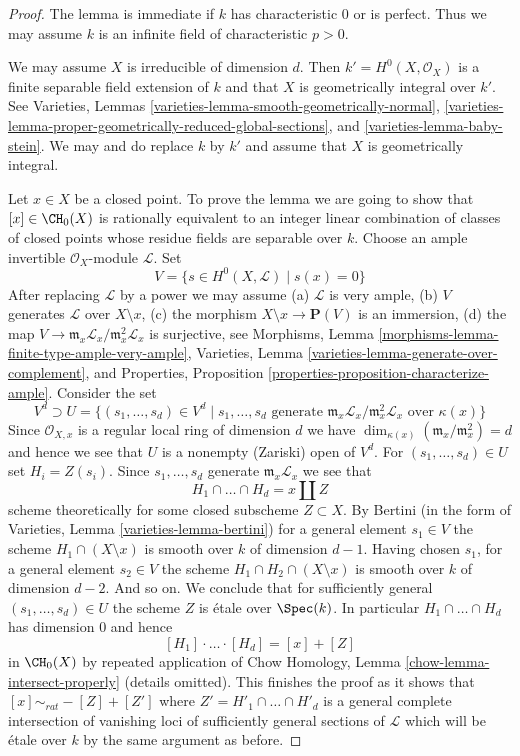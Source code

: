 \begin{proof}
The lemma is immediate if $k$ has characteristic $0$ or is perfect.
Thus we may assume $k$ is an infinite field of characteristic $p > 0$.

\medskip\noindent
We may assume $X$ is irreducible of dimension $d$.
Then $k' = H^0(X, \mathcal{O}_X)$ is a finite separable field
extension of $k$ and that $X$ is geometrically integral over $k'$.
See Varieties, Lemmas \ref{varieties-lemma-smooth-geometrically-normal},
\ref{varieties-lemma-proper-geometrically-reduced-global-sections}, and
\ref{varieties-lemma-baby-stein}. We may and do replace $k$ by $k'$
and assume that $X$ is geometrically integral.

\medskip\noindent
Let $x \in X$ be a closed point. To prove the lemma we are going to show that
$[x] \in \CH_0(X)$ is rationally equivalent to an integer linear
combination of classes of closed points whose residue fields
are separable over $k$. Choose an ample invertible
$\mathcal{O}_X$-module $\mathcal{L}$. Set
$$
V = \{s \in H^0(X, \mathcal{L}) \mid s(x) = 0 \}
$$
After replacing $\mathcal{L}$ by a power we may assume
(a) $\mathcal{L}$ is very ample, (b) $V$ generates
$\mathcal{L}$ over $X \setminus x$, (c) the morphism
$X \setminus x \to \mathbf{P}(V)$ is an immersion, (d)
the map $V \to \mathfrak m_x\mathcal{L}_x/\mathfrak m_x^2\mathcal{L}_x$
is surjective, see
Morphisms, Lemma \ref{morphisms-lemma-finite-type-ample-very-ample},
Varieties, Lemma \ref{varieties-lemma-generate-over-complement}, and
Properties, Proposition \ref{properties-proposition-characterize-ample}.
Consider the set
$$
V^d \supset U =
\{
(s_1, \ldots, s_d) \in V^d \mid s_1, \ldots, s_d
\text{ generate }
\mathfrak m_x\mathcal{L}_x/\mathfrak m_x^2\mathcal{L}_x
\text{ over }\kappa(x)
\}
$$
Since $\mathcal{O}_{X, x}$ is a regular local ring of dimension $d$
we have $\dim_{\kappa(x)}(\mathfrak m_x/\mathfrak m_x^2) = d$
and hence we see that $U$ is a nonempty (Zariski) open of $V^d$.
For $(s_1, \ldots, s_d) \in U$ set $H_i = Z(s_i)$. Since
$s_1, \ldots, s_d$ generate $\mathfrak m_x\mathcal{L}_x$
we see that
$$
H_1 \cap \ldots \cap H_d = x \amalg Z
$$
scheme theoretically for some closed subscheme $Z \subset X$.
By Bertini (in the form of Varieties, Lemma \ref{varieties-lemma-bertini})
for a general element $s_1 \in V$ the scheme $H_1 \cap (X \setminus x)$
is smooth over $k$ of dimension $d - 1$.
Having chosen $s_1$, for a general element
$s_2 \in V$ the scheme $H_1 \cap H_2 \cap (X \setminus x)$
is smooth over $k$ of dimension $d - 2$. And so on.
We conclude that for sufficiently general
$(s_1, \ldots, s_d) \in U$ the scheme $Z$ is \'etale over $\Spec(k)$.
In particular $H_1 \cap \ldots \cap H_d$ has dimension $0$
and hence
$$
[H_1] \cdot \ldots \cdot [H_d] = [x] + [Z]
$$
in $\CH_0(X)$ by repeated application of
Chow Homology, Lemma \ref{chow-lemma-intersect-properly} (details omitted).
This finishes the proof as it shows that $[x] \sim_{rat} - [Z] + [Z']$
where $Z' = H'_1 \cap \ldots \cap H'_d$ is a general complete
intersection of vanishing loci of sufficiently general sections
of $\mathcal{L}$ which will be \'etale over $k$ by the same argument
as before.
\end{proof}


